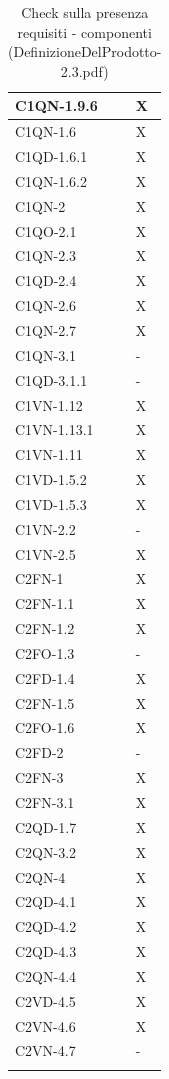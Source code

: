 \begin{footnotesize}
\begin{longtable}{|p{}|p{}|}
 C1QN-1.9.6 &X  \\ \hline
 C1QN-1.6 &X \\ \hline
 C1QD-1.6.1&X \\ \hline
 C1QN-1.6.2&X   \\ \hline
 C1QN-2&X \\ \hline
 C1QO-2.1&X \\ \hline
 C1QN-2.3&X  \\ \hline
 C1QD-2.4&X  \\ \hline
 C1QN-2.6&X  \\ \hline
 C1QN-2.7&X    \\ \hline
 C1QN-3.1&-   \\ \hline
 C1QD-3.1.1&-    \\ \hline
 C1VN-1.12&X \\ \hline
 C1VN-1.13.1&X  \\ \hline
 C1VN-1.11&X  \\ \hline
 C1VD-1.5.2&X \\ \hline
 C1VD-1.5.3&X   \\ \hline
 C1VN-2.2&- \\ \hline
 C1VN-2.5&X  \\ \hline
 C2FN-1&X    \\ \hline
 C2FN-1.1&X    \\ \hline
 C2FN-1.2&X   \\ \hline
 C2FO-1.3&-    \\ \hline
 C2FD-1.4&X   \\ \hline
 C2FN-1.5&X   \\ \hline
 C2FO-1.6&X   \\ \hline
 C2FD-2&-    \\ \hline
 C2FN-3&X   \\ \hline
 C2FN-3.1&X   \\ \hline
 C2QD-1.7&X   \\ \hline
 C2QN-3.2&X   \\ \hline
 C2QN-4 &X  \\ \hline
 C2QD-4.1&X    \\ \hline
 C2QD-4.2&X   \\ \hline
 C2QD-4.3&X   \\ \hline
 C2QN-4.4&X  \\ \hline
 C2VD-4.5&X   \\ \hline
 C2VN-4.6&X    \\ \hline
 C2VN-4.7&-  \\ \hline

\caption{Check sulla presenza requisiti - componenti
(DefinizioneDelProdotto-2.3.pdf)}
\end{longtable}
\end{footnotesize}

